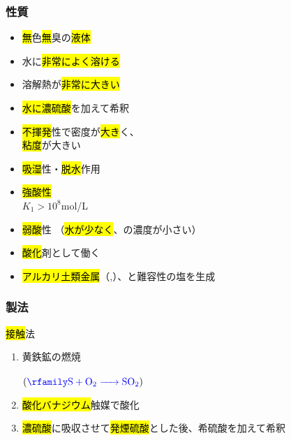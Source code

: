 \subsubsection{性質}
\begin{itemize}
      \item \hl{無}色\hl{無}臭の\hl{液体}
      \item 水に\hl{非常によく溶ける}
      \item 溶解熱が\hl{非常に大きい}
      \item \hl{水に濃硫酸}を加えて希釈
      \item \hl{不揮発}性で密度が\hl{大き}く、\\
      \hfill \hl{粘度}が大きい 
      \item \hl{吸湿}性・\hl{脱水}作用 
      \item \hl{強酸性} \\
            \hl{} \hfill $K_{1}>10^8$mol/L
      \item \hl{弱酸}性  （\hl{水が少なく}、\hl{}の濃度が小さい）
      \item \hl{酸化}剤として働く \\
      \item \hl{アルカリ土類金属}（\hl{},\hl{}）、\hl{}と難容性の塩を生成 
\end{itemize}
\subsubsection{製法}
\begin{itembox}[l]{\hl{接触}法 \K}
      \begin{enumerate}
            \item 黄鉄鉱の燃焼\\
                  \\
                  $\left(\hce{S + O2 -> SO2}\right)$
            \item \hl{酸化バナジウム}触媒で酸化\\
            \item \hl{濃硫酸}に吸収させて\hl{発煙硫酸}とした後、希硫酸を加えて希釈\\
      \end{enumerate}
\end{itembox}
